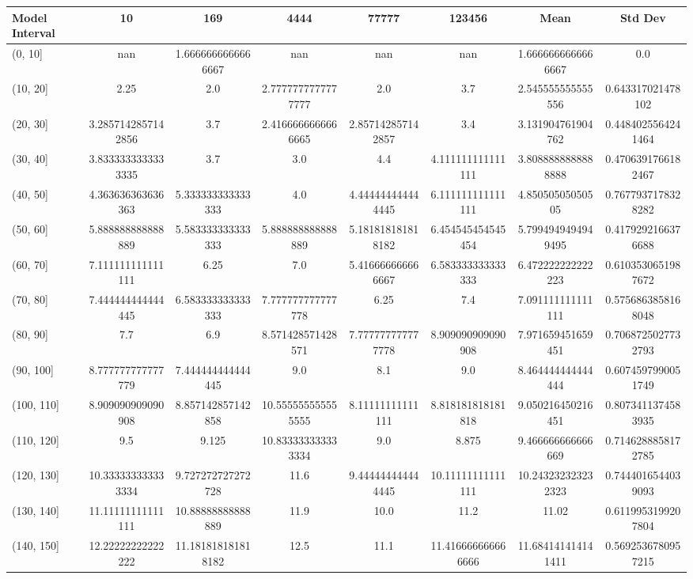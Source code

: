 \begin{table}[H]
\centering
\begin{tabular}{|l |c |c |c |c |c |c |c|}
\hline
Model Interval & 10 & 169 & 4444 & 77777 & 123456 & Mean & Std Dev \\
\hline
(0, 10] & nan & 1.6666666666666667 & nan & nan & nan & 1.6666666666666667 & 0.0 \\
(10, 20] & 2.25 & 2.0 & 2.7777777777777777 & 2.0 & 3.7 & 2.545555555555556 & 0.643317021478102 \\
(20, 30] & 3.2857142857142856 & 3.7 & 2.4166666666666665 & 2.857142857142857 & 3.4 & 3.131904761904762 & 0.4484025564241464 \\
(30, 40] & 3.8333333333333335 & 3.7 & 3.0 & 4.4 & 4.111111111111111 & 3.8088888888888888 & 0.4706391766182467 \\
(40, 50] & 4.363636363636363 & 5.333333333333333 & 4.0 & 4.444444444444445 & 6.111111111111111 & 4.85050505050505 & 0.7677937178328282 \\
(50, 60] & 5.888888888888889 & 5.583333333333333 & 5.888888888888889 & 5.181818181818182 & 6.454545454545454 & 5.7994949494949495 & 0.4179292166376688 \\
(60, 70] & 7.111111111111111 & 6.25 & 7.0 & 5.416666666666667 & 6.583333333333333 & 6.472222222222223 & 0.6103530651987672 \\
(70, 80] & 7.444444444444445 & 6.583333333333333 & 7.777777777777778 & 6.25 & 7.4 & 7.091111111111111 & 0.5756863858168048 \\
(80, 90] & 7.7 & 6.9 & 8.571428571428571 & 7.777777777777778 & 8.909090909090908 & 7.971659451659451 & 0.7068725027732793 \\
(90, 100] & 8.777777777777779 & 7.444444444444445 & 9.0 & 8.1 & 9.0 & 8.464444444444444 & 0.6074597990051749 \\
(100, 110] & 8.909090909090908 & 8.857142857142858 & 10.555555555555555 & 8.11111111111111 & 8.818181818181818 & 9.050216450216451 & 0.8073411374583935 \\
(110, 120] & 9.5 & 9.125 & 10.833333333333334 & 9.0 & 8.875 & 9.466666666666669 & 0.7146288858172785 \\
(120, 130] & 10.333333333333334 & 9.727272727272728 & 11.6 & 9.444444444444445 & 10.11111111111111 & 10.243232323232323 & 0.7444016544039093 \\
(130, 140] & 11.11111111111111 & 10.88888888888889 & 11.9 & 10.0 & 11.2 & 11.02 & 0.6119953199207804 \\
(140, 150] & 12.22222222222222 & 11.181818181818182 & 12.5 & 11.1 & 11.416666666666666 & 11.684141414141411 & 0.5692536780957215 \\

\end{tabular}
\end{table}
